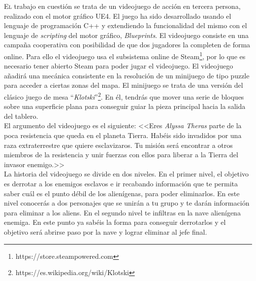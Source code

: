 \lettrine[lines=2,findent=2pt,nindent=3pt,loversize=0.1]{\textcolor[gray]{0.4}{E}}{l} trabajo en cuestión se trata de un videojuego de acción en tercera persona, realizado con el motor gráfico \ac{UE4}. El juego ha sido desarrollado usando el lenguaje de programación C++ y extendiendo la funcionalidad del mismo con el lenguaje de \textit{scripting} del motor gráfico, \textit{Blueprints}. El videojuego consiste en una campaña cooperativa con posibilidad de que dos jugadores la completen de forma online. Para ello el videojuego usa el subsistema online de Steam\footnote{https://store.steampowered.com}, por lo que es necesario tener abierto Steam para poder jugar el videojuego. El videojuego añadirá una mecánica consistente en la resolución de un minijuego de tipo puzzle para acceder a ciertas zonas del mapa. El minijuego se trata de una versión del clásico juego de mesa ``\textit{Klotski}''\footnote{https://es.wikipedia.org/wiki/Klotski}. En él, tendrás que mover una serie de bloques sobre una superficie plana para conseguir guiar la pieza principal hacia la salida del tablero.\\


El argumento del videojuego es el siguiente: <<Eres \textit{Alyssa Theras} parte de la poca resistencia que queda en el planeta Tierra. Habéis sido invadidos por una raza extraterrestre que quiere esclavizaros. Tu misión será encontrar a otros miembros de la resistencia y unir fuerzas con ellos para liberar a la Tierra del invasor enemigo.>>\\


La historia del videojuego se divide en dos niveles. En el primer nivel, el objetivo es derrotar a los enemigos esclavos e ir recabando información que te permita saber cuál es el punto débil de los alienígenas, para poder eliminarlos. En este nivel conocerás a dos personajes que se unirán a tu grupo y te darán información para eliminar a los aliens. En el segundo nivel te infiltras en la nave alienígena enemiga. En este punto ya sabéis la forma para conseguir derrotarlos y el objetivo será abrirse paso por la nave y lograr eliminar al jefe final.